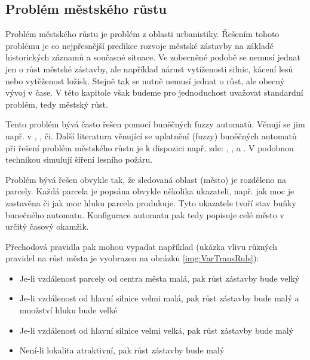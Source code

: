 \documentclass[a4paper,10pt]{article}
\begin{document}
\subsection{Problém městského růstu} \label{subs:UrbGrow}
Problém městského růstu je problém z oblasti urbanistiky. Řešením tohoto problému je co nejpřesnější predikce rozvoje městské zástavby na základě historických záznamů a současné situace. Ve zobecněné podobě se nemusí jednat jen o růst městské zástavby, ale například nárust vytíženosti silnic, kácení lesů nebo vytěženost ložisk. Stejně tak se nutně nemusí jednat o růst, ale obecný vývoj v čase. V této kapitole však budeme pro jednoduchost uvažovat standardní problém, tedy městský růst.

Tento problém bývá často řešen pomocí buněčných fuzzy automatů. Věnují se jim např. v \cite{AlAhHep+-ModUrbGroDynUsCelAutGIS}, \cite{Ahm+-CalFuzCelAutModUrbDynSauAr} \cite{War+-StoConCelModUrbGro} \cite{WhiEng-CelAutBasIntDynRegMod}  \cite{LaiDraSch-IntMulEvCelAutMetLanSimMod} \cite{ManHatPra-FuzCelAutBasSheModUrGro+}, \cite{ManHatPra-ModUrbGroUsFuzCelAut} \cite{ClaHopHay-SelModCelAutModHistUrbSanFraBayAre} či\cite{Wu-CalStoCelAutAppRurUrbLanConv}. %
%
Další literatura věnující se uplatnění (fuzzy) buněčných automatů při řešení problém městského růstu je k dispozici např. zde: \cite{PowSimWhi-HieFuzzPattMatcRegCompLanUseMap}, \cite{Dra-CouFuzSetTheGisBaCelAutLanUseChaMod}, \cite{WasPar-PreSpaDisEleEnCon+} a \cite{LiuPhi-DevCelAutModUrbGroIncFuzSetApp}. V \cite{MraZimLapBaj-FuzCelAut+} podobnou technikou simulují šíření lesního požáru.

Problém bývá řešen obvykle tak, že sledovaná oblast (město) je rozděleno na parcely. Každá parcela je popsána obvykle několika ukazateli, např. jak moc je zastavěna či jak moc hluku parcela produkuje. Tyto ukazatele tvoří stav buňky bunečného automatu. Konfigurace automatu pak tedy popisuje celé město v určitý časový okamžik.

Přechodová pravidla pak mohou vypadat například (ukázka vlivu různých pravidel na růst města je vyobrazen na obrázku \ref{img:VarTransRuls}):
\begin{itemize}
 \item Je-li vzdálenost parcely od centra města malá, pak růst zástavby bude velký
 \item Je-li vzdálenost od hlavní silnice velmi malá, pak růst zástavby bude malý a množství hluku bude velké
 \item Je-li vzdálenost od hlavní silnice velmi velká, pak růst zástavby bude malý
 \item Není-li lokalita atraktivní, pak růst zástavby bude malý
\end{itemize}
\end{document}
